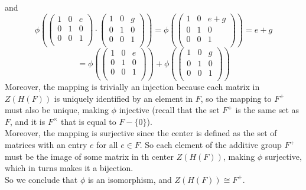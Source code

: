 \documentclass{article}
\begin{document}
    and
    \[ \phi \left( \begin{pmatrix}
        1 & 0 & e \\        
        0 & 1 & 0 \\
        0 & 0 & 1 \\
    \end{pmatrix} \cdot \begin{pmatrix}
        1 & 0 & g \\        
        0 & 1 & 0 \\
        0 & 0 & 1 \\
    \end{pmatrix} \right)
    = \phi \left(\begin{pmatrix}
        1 & 0 & e + g \\        
        0 & 1 & 0 \\
        0 & 0 & 1 \\
    \end{pmatrix} \right)
    = e + g \]
    \[ = \phi \left(\begin{pmatrix}
        1 & 0 & e \\        
        0 & 1 & 0 \\
        0 & 0 & 1 \\
    \end{pmatrix} \right)
    + \phi \left(\begin{pmatrix}
        1 & 0 & g \\        
        0 & 1 & 0 \\
        0 & 0 & 1 \\
    \end{pmatrix} \right) \]
    Moreover, the mapping is trivially an injection
    because each matrix in $Z(H(F))$ is uniquely
    identified by an element in $F$,
    so the mapping to $F^+$ must also be unique,
    making $\phi$ injective
    (recall that the set $F^+$ is the same set as $F$,
    and it is $F^\times$ that is equal to $F - \{0\}$). \\
    Moreover, the mapping is surjective since 
    the center is defined as the set of matrices with an entry
    $e$ for all $e \in F$.
    So each element of the additive group $F^+$ must be the image
    of some matrix in th center $Z(H(F))$,
    making $\phi$ surjective,
    which in turns makes it a bijection. \\
    So we conclude that $\phi$ is an isomorphism,
    and $Z(H(F)) \cong F^+$.
\end{document}
